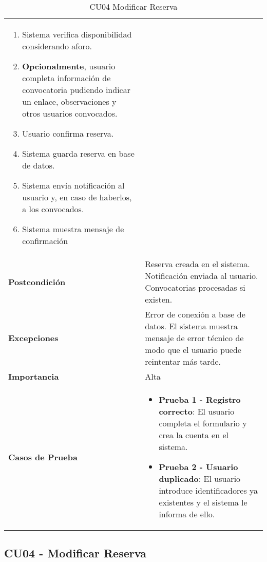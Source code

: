 \begin{table}[H]
\begin{tabularx}{\linewidth}{ p{} p{} }
\begin{enumerate}
\begin{itemize}
  		\end{itemize}
            \item Sistema verifica disponibilidad considerando aforo.
            \item \textbf{Opcionalmente}, usuario completa información de convocatoria pudiendo indicar un enlace, observaciones y otros usuarios convocados.
            \item Usuario confirma reserva.
            \item Sistema guarda reserva en base de datos.
            \item Sistema envía notificación al usuario y, en caso de haberlos, a los convocados.
            \item Sistema muestra mensaje de confirmación
		\end{enumerate}\\
		\textbf{Postcondición}        & Reserva creada en el sistema. Notificación enviada al usuario. Convocatorias procesadas si existen.\\
		\textbf{Excepciones}          & Error de conexión a base de datos. El sistema muestra mensaje de error técnico de modo que el usuario puede reintentar más tarde.\\
		\textbf{Importancia}          & Alta \\
		\textbf{Casos de Prueba}      &
		\begin{itemize}
			\item \textbf{Prueba 1 - Registro correcto}: El usuario completa el formulario y crea la cuenta en el sistema.
			\item \textbf{Prueba 2 - Usuario duplicado}: El usuario introduce identificadores ya existentes y el sistema le informa de ello.
		\end{itemize} \\
		\bottomrule
	\end{tabularx}
	\caption{CU04 Modificar Reserva}
	\label{cu:crear-reserva}
\end{table}

\subsection{CU04 - Modificar Reserva}

